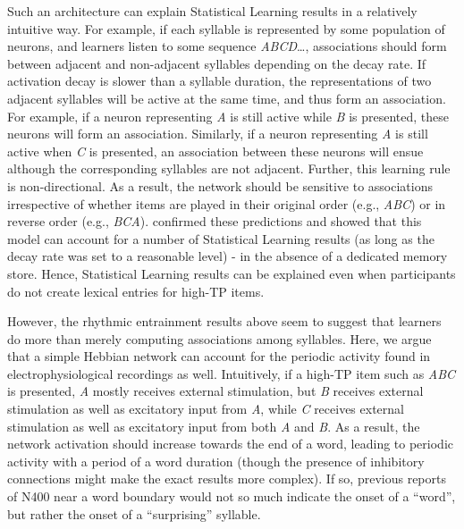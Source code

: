 \documentclass[
]{article}
\begin{document}
Such an architecture can explain Statistical Learning results in a
relatively intuitive way. For example, if each syllable is represented
by some population of neurons, and learners listen to some sequence
\emph{ABCD}\ldots, associations should form between adjacent and
non-adjacent syllables depending on the decay rate. If activation decay
is slower than a syllable duration, the representations of two adjacent
syllables will be active at the same time, and thus form an association.
For example, if a neuron representing \emph{A} is still active while
\emph{B} is presented, these neurons will form an association.
Similarly, if a neuron representing \emph{A} is still active when
\emph{C} is presented, an association between these neurons will ensue
although the corresponding syllables are not adjacent. Further, this
learning rule is non-directional. As a result, the network should be
sensitive to associations irrespective of whether items are played in
their original order (e.g., \emph{ABC}) or in reverse order (e.g.,
\emph{BCA}). \citep{Endress-TP-Model} confirmed these predictions and
showed that this model can account for a number of Statistical Learning
results (as long as the decay rate was set to a reasonable level) - in
the absence of a dedicated memory store. Hence, Statistical Learning
results can be explained even when participants do not create lexical
entries for high-TP items.

However, the rhythmic entrainment results above seem to suggest that
learners do more than merely computing associations among syllables.
Here, we argue that a simple Hebbian network can account for the
periodic activity found in electrophysiological recordings as well.
Intuitively, if a high-TP item such as \emph{ABC} is presented, \emph{A}
mostly receives external stimulation, but \emph{B} receives external
stimulation as well as excitatory input from \emph{A}, while \emph{C}
receives external stimulation as well as excitatory input from both
\emph{A} and \emph{B}. As a result, the network activation should
increase towards the end of a word, leading to periodic activity with a
period of a word duration (though the presence of inhibitory connections
might make the exact results more complex). If so, previous reports of
N400 near a word boundary would not so much indicate the onset of a
``word'', but rather the onset of a ``surprising'' syllable.
\end{document}
